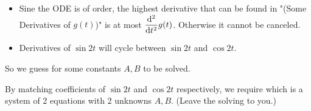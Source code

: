 \documentclass[class=article, crop=false, 12pt]{standalone}
\begin{document}
\begin{example}

    \begin{itemize}
        \item Sine the ODE is of  order, 
        the highest derivative that can be found in "(Some Derivatives of $g(t)$)" is at most $\dvv[2]{t}g(t)$.
        Otherwise it cannot be canceled.

        \item Derivatives of $\sin{2t}$ will cycle between $\sin{2t}$ and $\cos{2t}$. 

    \end{itemize}

    So we guess 
    for some constants $A,B$ to be solved. 


    By matching coefficients of $\sin{2t}$ and $\cos{2t}$ respectively, we require
    which is a system of 2 equations with 2 unknowns $A,B$. (Leave the solving to you.)\\

\end{example}
\end{document}

